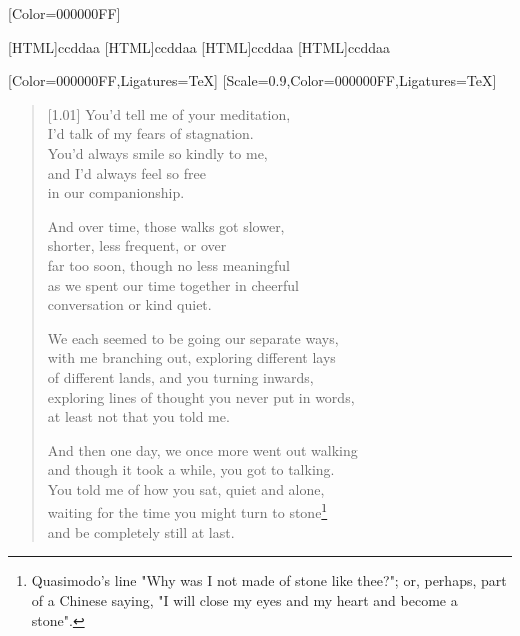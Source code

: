 \renewfontfamily{}[Color=000000FF]

[HTML]{ccddaa}
[HTML]{ccddaa}
[HTML]{ccddaa}
[HTML]{ccddaa}
\begin{paracol}{2}
  \begin{leftcolumn}
[Color=000000FF,Ligatures=TeX]
\renewfontfamily{}[Scale=0.9,Color=000000FF,Ligatures=TeX]

\begin{verse}[1.01\textwidth]
You'd tell me of your meditation,\\
I'd talk of my fears of stagnation.\\
You'd always smile so kindly to me,\\
and I'd always feel so free\\
in our companionship.

And over time, those walks got slower,\\
shorter, less frequent, or over\\
far too soon, though no less meaningful\\
as we spent our time together in cheerful\\
conversation or kind quiet.

We each seemed to be going our separate ways,\\
with me branching out, exploring different lays\\
of different lands, and you turning inwards,\\
exploring lines of thought you never put in words,\\
at least not that you told me.

And then one day, we once more went out walking\\
and though it took a while, you got to talking.\\
You told me of how  you sat, quiet and alone,\\
waiting for the time you might turn to stone\footnote{Quasimodo's line "Why was I not made of stone like thee?"; or, perhaps, part of a Chinese saying, "I will close my eyes and my heart and become a stone".}\\
and be completely still at last.
\end{verse}
\newpage
\end{leftcolumn}
\end{paracol}

